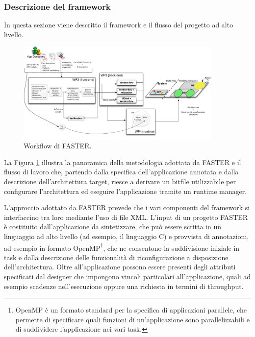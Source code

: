 \subsubsection{Descrizione del framework}
In questa sezione viene descritto il framework e il flusso del progetto ad  
alto livello.

\begin{figure}
 \begin{center}  
\includegraphics[width=0.9\textwidth]
{capitoli/figure/cap2/FASTERWorkflow.pdf}
\caption{Workflow di \ac{FASTER}.}
\label{fig:FASTERWorkflow}
 \end{center}
\end{figure}

La Figura \ref{fig:FASTERWorkflow} illustra la panoramica della metodologia 
adottata da \ac{FASTER} e il flusso di lavoro che, partendo dalla specifica 
dell'applicazione annotata e dalla descrizione dell'architettura target, riesce 
a derivare un bitfile utilizzabile per configurare l'architettura ed eseguire 
l'applicazione tramite un runtime manager.

L'approccio adottato da \ac{FASTER} prevede che i vari componenti del framework 
si interfaccino tra loro mediante l'uso di file XML. L'input di un progetto 
\ac{FASTER} è costituito dall'applicazione da sintetizzare, che può 
essere scritta in un linguaggio ad alto livello (ad esempio, il linguaggio C) e 
provvista di annotazioni, ad esempio in formato OpenMP\footnote{OpenMP è un 
formato standard per la specifica di applicazioni parallele, che permette di 
specificare quali funzioni di un'applicazione sono parallelizzabili e di 
suddividere l'applicazione nei vari task.}, che ne consentono la suddivisione 
iniziale in task e dalla descrizione delle funzionalità di riconfigurazione a 
disposizione dell'architettura. Oltre all'applicazione possono essere presenti 
degli attributi specificati dal designer che impongono vincoli particolari 
all'applicazione, quali ad esempio scadenze nell'esecuzione oppure una 
richiesta in termini di throughput.

